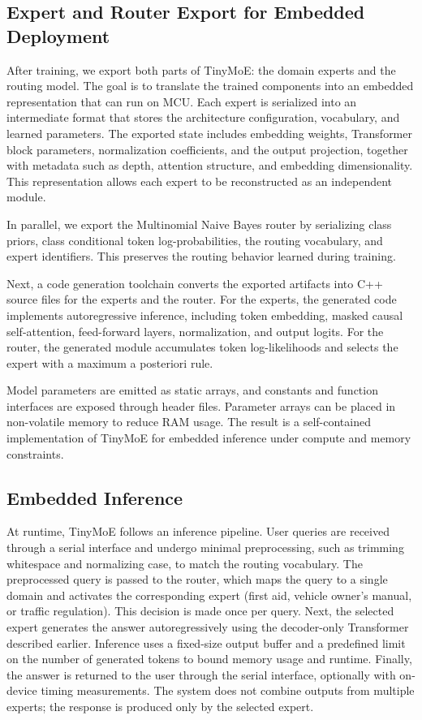 \documentclass[conference]{IEEEtran}
\begin{document}
\subsection{Expert and Router Export for Embedded Deployment}
\label{sec:export_codegen}

After training, we export both parts of TinyMoE: the domain experts and the routing model. The goal is to translate the trained components into an embedded representation that can run on MCU. Each expert is serialized into an intermediate format that stores the architecture configuration, vocabulary, and learned parameters. The exported state includes embedding weights, Transformer block parameters, normalization coefficients, and the output projection, together with metadata such as depth, attention structure, and embedding dimensionality. This representation allows each expert to be reconstructed as an independent module.

In parallel, we export the Multinomial Naive Bayes router by serializing class priors, class conditional token log-probabilities, the routing vocabulary, and expert identifiers. This preserves the routing behavior learned during training.

Next, a code generation toolchain converts the exported artifacts into C++ source files for the experts and the router. For the experts, the generated code implements autoregressive inference, including token embedding, masked causal self-attention, feed-forward layers, normalization, and output logits. For the router, the generated module accumulates token log-likelihoods and selects the expert with a maximum a posteriori rule.

Model parameters are emitted as static arrays, and constants and function interfaces are exposed through header files. Parameter arrays can be placed in non-volatile memory to reduce RAM usage. The result is a self-contained implementation of TinyMoE for embedded inference under compute and memory constraints.


\subsection{Embedded Inference}
\label{subsec:embedded_inference}

At runtime, TinyMoE follows an inference pipeline. User queries are received through a serial interface and undergo minimal preprocessing, such as trimming whitespace and normalizing case, to match the routing vocabulary. The preprocessed query is passed to the router, which maps the query to a single domain and activates the corresponding expert (first aid, vehicle owner’s manual, or traffic regulation). This decision is made once per query. Next, the selected expert generates the answer autoregressively using the decoder-only Transformer described earlier. Inference uses a fixed-size output buffer and a predefined limit on the number of generated tokens to bound memory usage and runtime. Finally, the answer is returned to the user through the serial interface, optionally with on-device timing measurements. The system does not combine outputs from multiple experts; the response is produced only by the selected expert.
\end{document}

